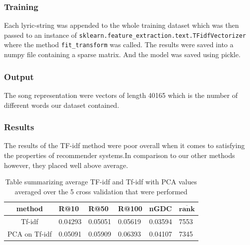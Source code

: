 \subsubsection{Training}
Each lyric-string was appended to the whole training dataset which was then passed to an instance of \texttt{sklearn.feature\_extraction.text.TFidfVectorizer} where the method \texttt{fit\_transform} was called. The results were saved into a numpy file containing a sparse matrix. And the model was saved using pickle.\\

\subsubsection{Output}
The song representation were vectors of length 40165 which is the number of different words our dataset contained.

\subsubsection{Results}

The results of the TF-idf method were poor overall when it comes to satisfying the properties of recommender systems.In comparison to our other methods however, they placed well above average. \\

\begin{table}[h!]
\centering
\renewcommand{\arraystretch}{1.5}
\begin{tabu} to 1\textwidth {| c || X[c] | X[c] | X[c] | X[c] | X[c] | }
 \hline
 \textbf{method} & \textbf{R@10} & \textbf{R@50} & \textbf{R@100} & \textbf{nGDC} & $ \boldsymbol{\overline{rank}} $ \\
 \hline
 \hline
 Tf-idf & 0.04293 & 0.05051 & 0.05619 & 0.03594 & 7553 \\
 \hline
 PCA on Tf-idf & 0.05091 & 0.05909 & 0.06393 & 0.04107 & 7345 \\
 \hline
\end{tabu} \\
\caption{Table summarizing average TF-idf and Tf-idf with PCA values averaged over the 5 cross validation that were performed}
\label{table:1}
\end{table}

